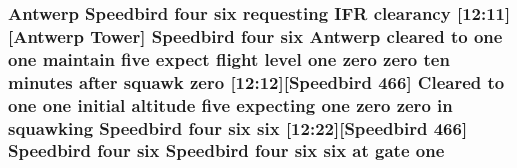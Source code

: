 \subsubsection[{\texorpdfstring{one}{one}}]{\setlength{\rightskip}{0pt plus 5cm}Antwerp Speedbird four {\bf six} requesting I\+FR clearancy \mbox{[}12\+:11\mbox{]}\mbox{[}Antwerp {\bf Tower}\mbox{]} Speedbird four {\bf six} Antwerp cleared to one one maintain five expect flight level one {\bf zero} {\bf zero} {\bf ten} minutes after squawk {\bf zero} \mbox{[}12\+:12\mbox{]}\mbox{[}Speedbird 466\mbox{]} Cleared to one one initial altitude five expecting one {\bf zero} {\bf zero} in {\bf squawking} Speedbird four {\bf six} {\bf six} \mbox{[}12\+:22\mbox{]}\mbox{[}Speedbird 466\mbox{]} Speedbird four {\bf six} Speedbird four {\bf six} {\bf six} at gate one}\hypertarget{happyDay4ATC_8txt_a1bdf675837626f29e859d1a241701d26}{}\label{happyDay4ATC_8txt_a1bdf675837626f29e859d1a241701d26}
